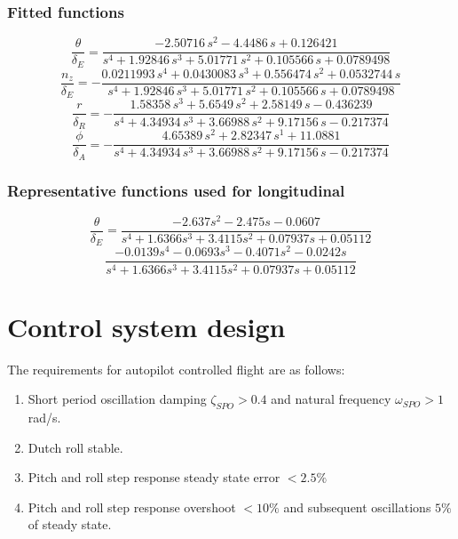 \documentclass{article}
\begin{document}
\subsubsection{Fitted functions}
\begin{equation}
    \frac{\theta}{\delta_E} =
    \frac{-2.50716\,s^2-4.4486\,s+0.126421}{s^4+1.92846\,s^3+5.01771\,s^2+0.105566\,s+0.0789498}
    \label{eq:pitch_elev}
\end{equation}
\begin{equation}
    \frac{n_z}{\delta_E} =
    -\frac{0.0211993\,s^4+0.0430083\,s^3+0.556474\,s^2+0.0532744\,s}{s^4+1.92846\,s^3+5.01771\,s^2+0.105566\,s+0.0789498}
    \label{eq:naccel_elev}
\end{equation}
\begin{equation}
    \frac{r}{\delta_R} =
    -\frac{1.58358\,s^3+5.6549\,s^2+2.58149\,s-0.436239}{s^4+4.34934\,s^3+3.66988\,s^2+9.17156\,s-0.217374}
    \label{eq:yaw_rud}
\end{equation}
\begin{equation}
    \frac{\phi}{\delta_A} =
    -\frac{4.65389\,s^2+2.82347\,s^1+11.0881}{s^4+4.34934\,s^3+3.66988\,s^2+9.17156\,s-0.217374}
    \label{eq:roll_ail}
\end{equation}
\subsubsection{Representative functions used for longitudinal}
\begin{equation}
    \frac{\theta}{\delta_E} = \frac{-2.637s^2 - 2.475s - 0.0607}{s^4 + 1.6366s^3 + 3.4115s^2 + 0.07937s + 0.05112}
\end{equation}
\begin{equation}
    \frac{-0.0139s^4 - 0.0693s^3 - 0.4071s^2 - 0.0242s}{s^4 + 1.6366s^3 + 3.4115s^2 + 0.07937s + 0.05112}
\end{equation}

\section{Control system design}

The requirements for autopilot controlled flight are as follows:
\begin{enumerate}
    \renewcommand{\labelenumi}{\alph{enumi})}
    \item Short period oscillation damping $\zeta_{SPO} > 0.4$ and natural frequency $\omega_{SPO} > 1$ rad/s.
    \item Dutch roll stable. \label{req:DR}
    \item Pitch and roll step response steady state error $< 2.5 \%$
    \item Pitch and roll step response overshoot $< 10 \%$ and subsequent oscillations $5 \%$ of steady state.
\end{enumerate}
\end{document}
